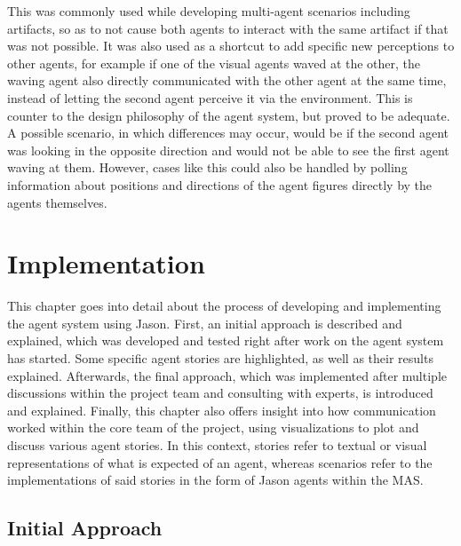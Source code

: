 \documentclass[draft,final]{vutinfth} %
\begin{document}
This was commonly used while developing multi-agent scenarios including artifacts, so as to not cause both agents to interact with the same artifact if that was not possible. 
It was also used as a shortcut to add specific new perceptions to other agents, for example if one of the visual agents waved at the other, the waving agent also directly communicated with the other agent at the same time, instead of letting the second agent perceive it via the environment. 
This is counter to the design philosophy of the agent system, but proved to be adequate.
A possible scenario, in which differences may occur, would be if the second agent was looking in the opposite direction and would not be able to see the first agent waving at them. 
However, cases like this could also be handled by polling information about positions and directions of the agent figures directly by the agents themselves.

\chapter{Implementation}
\label{chap:implementation}

This chapter goes into detail about the process of developing and implementing the agent system using Jason. 
First, an initial approach is described and explained, which was developed and tested right after work on the agent system has started. 
Some specific agent stories are highlighted, as well as their results explained. 
Afterwards, the final approach, which was implemented after multiple discussions within the project team and consulting with experts, is introduced and explained. 
Finally, this chapter also offers insight into how communication worked within the core team of the project, using visualizations to plot and discuss various agent stories. 
In this context, stories refer to textual or visual representations of what is expected of an agent, whereas scenarios refer to the implementations of said stories in the form of Jason agents within the MAS.

\section{Initial Approach}
\label{chap:initialapproach}
\end{document}
